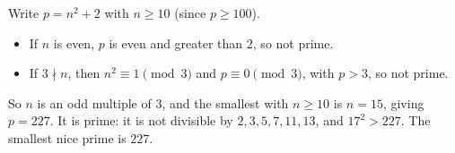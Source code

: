 Write $p=n^2+2$ with $n\ge10$ (since $p\ge100$).
\begin{itemize}
\item If $n$ is even, $p$ is even and greater than $2$, so not prime.
\item If $3\nmid n$, then $n^2\equiv1\pmod3$ and $p\equiv0\pmod3$, with $p>3$, so not prime.
\end{itemize}
So $n$ is an odd multiple of $3$, and the smallest with $n\ge10$ is $n=15$, giving $p=227$. It is prime: it is not divisible by $2,3,5,7,11,13$, and $17^2>227$. The smallest nice prime is $\boxed{227}$.
